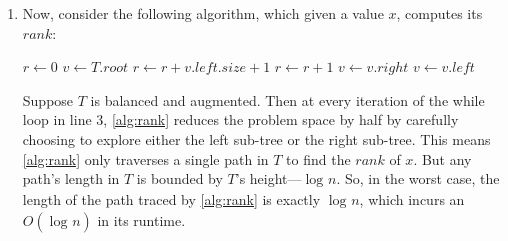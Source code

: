 \documentclass[10pt, letterpaper]{article}
\begin{document}
\begin{enumerate}[label={\bfseries Q\arabic*.}]
\begin{enumerate}
      \item
        Now, consider the following algorithm, which given a value $x$, computes its $rank$:
        \vspace{-5mm}
        \begin{center}
          \begin{minipage}{\linewidth}
            \begin{algorithm}[H]
              \caption{$\textsc{Rank}(T,x)$}\label{alg:rank}
              \begin{algorithmic}[1]
                \State $r \gets 0$ 
                \State $v \gets T.root$
                    \State $r \gets r + v.left.size + 1$ 
                    \Else
                      \State $r \gets r + 1$ 
                    \EndIf
                      \State {}
                    \EndIf
                    \State $v \gets v.right$ 
                  \Else
                    \State $v \gets v.left$ 
                  \EndIf
                \EndWhile
                \State {} 
              \end{algorithmic}
            \end{algorithm}
          \end{minipage}
        \end{center}

        Suppose $T$ is balanced and augmented. Then at every iteration of the while loop in line $3$,
        \autoref{alg:rank} reduces the problem space by half by carefully choosing to explore either
        the left sub-tree or the right sub-tree. This means \autoref{alg:rank} only traverses a single
        path in $T$ to find the $rank$ of $x$. But any path's length in $T$ is bounded by $T$'s height---$\log_{}n$.
        So, in the worst case, the length of the path traced by \autoref{alg:rank} is exactly $\log_{}n$,
        which incurs an $O(\log_{}n)$ in its runtime.


\end{enumerate}
\end{enumerate}
\end{document}
